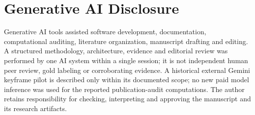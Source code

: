 \section*{Generative AI Disclosure}
Generative AI tools assisted software development, documentation, computational auditing, literature organization, manuscript drafting and editing. A structured methodology, architecture, evidence and editorial review was performed by one AI system within a single session; it is not independent human peer review, gold labeling or corroborating evidence. A historical external Gemini keyframe pilot is described only within its documented scope; no new paid model inference was used for the reported publication-audit computations. The author retains responsibility for checking, interpreting and approving the manuscript and its research artifacts.

